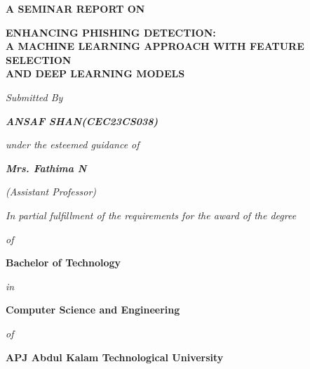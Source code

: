 \documentclass[12pt,a4paper]{report}
\newcommand{\studentname}{ANSAF SHAN}
\newcommand{\rollno}{CEC23CS038}
\newcommand{\guidename}{Mrs. Fathima N}
\begin{document}

\begin{titlepage}
\thispagestyle{empty}
\begin{center}

\vspace*{0.2cm}

{\Large\bfseries A SEMINAR REPORT ON}\par

\vspace{0.45cm}

{\fontsize{17}{21}\selectfont\bfseries
ENHANCING PHISHING DETECTION:\\
A MACHINE LEARNING APPROACH WITH FEATURE SELECTION\\
AND DEEP LEARNING MODELS}\par

\vspace{0.55cm}

{\large\itshape Submitted By}\par
\vspace{0.2cm}
{\large\bfseries\itshape \studentname (\rollno)}\par

\vspace{0.4cm}

{\large\itshape under the esteemed guidance of}\par
\vspace{0.2cm}
{\large\bfseries\itshape \guidename}\par
\vspace{0.1cm}
{\large\itshape (Assistant Professor)}\par

\vspace{0.4cm}

{\large\itshape In partial fulfillment of the requirements for the award of the degree}\par
{\large\itshape of}\par
{\large\bfseries Bachelor of Technology}\par
{\large\itshape in}\par
{\large\bfseries Computer Science and Engineering}\par
{\large\itshape of}\par
{\large\bfseries APJ Abdul Kalam Technological University}\par

\vfill


\end{center}
\end{titlepage}
\end{document}
